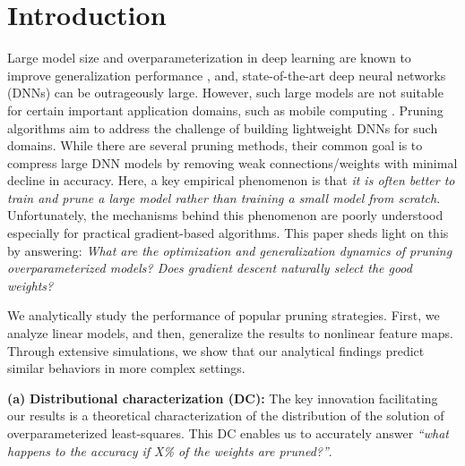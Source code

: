 \section{Introduction}

Large model size and overparameterization in deep learning are known to improve generalization performance \cite{neyshabur2017geometry}, and, state-of-the-art deep neural networks (DNNs) can be outrageously large. However, such large models are not suitable for certain important application domains, such as mobile computing \cite{tan2019mnasnet,sandler2018mobilenetv2}. Pruning algorithms aim to address the challenge of building lightweight DNNs for such domains. While there are several pruning methods, their common goal is to compress large DNN models by removing weak connections/weights with minimal decline in accuracy. Here, a key empirical phenomenon is that {\em{it is often better to train and prune a large model rather than training a small model from scratch}}. Unfortunately, the mechanisms behind this phenomenon are poorly understood especially for practical gradient-based algorithms. This paper sheds light on this by answering: {\em{What are the optimization and generalization dynamics of pruning overparameterized models? Does gradient descent naturally select the good weights?}} 



\vp
{} %
We analytically study the performance of popular pruning strategies. First, we analyze linear models, and then, generalize the results to nonlinear feature maps. Through extensive simulations, we show that our analytical findings predict similar behaviors in more complex settings.  

\noindent\textbf{(a)} {\bf{Distributional characterization (DC):}} The key innovation facilitating our results is a theoretical characterization of the distribution of the solution of overparameterized least-squares. This DC enables us to accurately answer {\em{``what happens to the accuracy if X\% of the weights are pruned?''}}.


